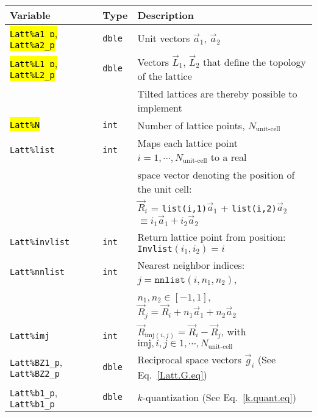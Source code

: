 %
\begin{table}[h!]
	\begin{center}
   \begin{tabular}{@{} l l @{$\;\;$} l @{}}\toprule
    Variable  & Type & Description \\\midrule
     \hl{\texttt{Latt\%a1\_p}, \texttt{Latt\%a2\_p}}   & \texttt{dble}  & Unit vectors $\vec{a}_1$,  $\vec{a}_2$ \\ 
     \hl{\texttt{Latt\%L1\_p}, \texttt{Latt\%L2\_p}}   & \texttt{dble}  & Vectors $\vec{L}_1$, $\vec{L}_2$ that define the topology of the  lattice \\
     									               &                &  Tilted lattices are  thereby possible to implement \\
    \hl{\texttt{Latt\%N}}                              & \texttt{int}   &  Number of lattice points, $N_{\text{unit-cell}}$ \\
    \texttt{Latt\%list}                                & \texttt{int}   &  Maps each lattice point $i=1,\cdots, N_{\text{unit-cell}}$ to a real\\
                                                                    &   &  space vector denoting the position of the unit cell: \\
                                                                    &   & $\vec{R}_i$ = \texttt{list(i,1)}$\vec{a}_1$ + \texttt{list(i,2)}$\vec{a}_2$  $  \equiv i_1  \vec{a}_1 + i_2  \vec{a}_2 $ \\
    \texttt{Latt\%invlist}                             & \texttt{int}   &  Return lattice point from position: \texttt{Invlist}$(i_1,i_2) = i $ \\
    \texttt{Latt\%nnlist}                              & \texttt{int}   &  Nearest neighbor indices: $j = \texttt{nnlist} (i, n_1, n_2) $, \\
                                                       &                &  $n_1, n_2 \in [-1,1] $, $\vec{R}_j = \vec{R}_i + n_1 \vec{a}_1  + n_2 \vec{a}_2 $ \\
   \texttt{Latt\%imj}                                  & \texttt{int}   &  $\vec{R}_{\mathrm{imj}(i,j)}  =  \vec{R}_i -  \vec{R}_j$, with  $\mathrm{imj}, i, j \in  1,\cdots, N_{\text{unit-cell}}$ \\
    \texttt{Latt\%BZ1\_p}, \texttt{Latt\%BZ2\_p}       & \texttt{dble}  & Reciprocal space vectors $\vec{g}_i$   (See Eq.~\ref{Latt.G.eq}) \\
    \texttt{Latt\%b1\_p}, \texttt{Latt\%b1\_p}         & \texttt{dble}  &  $k$-quantization (See Eq.~\ref{k.quant.eq}) \\

\end{tabular}
\end{center}
\end{table}
